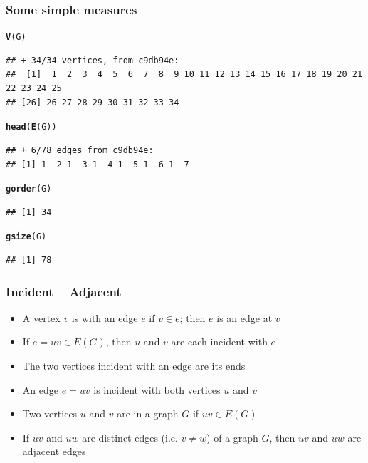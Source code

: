 \documentclass[aspectratio=169]{beamer}\usepackage[]{graphicx}\usepackage[]{xcolor}
\makeatletter
\newcommand{\hldef}[1]{\textcolor[rgb]{0.345,0.345,0.345}{#1}}%
\newcommand{\hlkwd}[1]{\textcolor[rgb]{0.737,0.353,0.396}{\textbf{#1}}}%
\newenvironment{kframe}{%
 \def\at@end@of@kframe{}%
 \ifinner\ifhmode%
  \def\at@end@of@kframe{\end{minipage}}%
  \begin{minipage}{\columnwidth}%
 \fi\fi%
 \def\FrameCommand##1{\hskip\@totalleftmargin \hskip-\fboxsep
 \colorbox{shadecolor}{##1}\hskip-\fboxsep
     \hskip-\linewidth \hskip-\@totalleftmargin \hskip\columnwidth}%
 \MakeFramed {\advance\hsize-\width
   \@totalleftmargin\z@ \linewidth\hsize
   \@setminipage}}%
 {\par\unskip\endMakeFramed%
 \at@end@of@kframe}
\newenvironment{knitrout}{}{} %
\makeatother
\begin{document}
\begin{frame}[fragile]\frametitle{Some simple measures}
\begin{knitrout}
\color{fgcolor}\begin{kframe}
\begin{alltt}
\hlkwd{V}\hldef{(G)}
\end{alltt}
\begin{verbatim}
## + 34/34 vertices, from c9db94e:
##  [1]  1  2  3  4  5  6  7  8  9 10 11 12 13 14 15 16 17 18 19 20 21 22 23 24 25
## [26] 26 27 28 29 30 31 32 33 34
\end{verbatim}
\begin{alltt}
\hlkwd{head}\hldef{(}\hlkwd{E}\hldef{(G))}
\end{alltt}
\begin{verbatim}
## + 6/78 edges from c9db94e:
## [1] 1--2 1--3 1--4 1--5 1--6 1--7
\end{verbatim}
\begin{alltt}
\hlkwd{gorder}\hldef{(G)}
\end{alltt}
\begin{verbatim}
## [1] 34
\end{verbatim}
\begin{alltt}
\hlkwd{gsize}\hldef{(G)}
\end{alltt}
\begin{verbatim}
## [1] 78
\end{verbatim}
\end{kframe}
\end{knitrout}
\end{frame}

\begin{frame}\frametitle{Incident -- Adjacent}
	\begin{definition}[Incident]
	\begin{itemize}
	\item A vertex $v$ is  with an edge $e$ if $v\in e$; then $e$ is an edge at $v$
	\item If $e=uv\in E(G)$, then $u$ and $v$ are each incident with $e$
	\item The two vertices incident with an edge are its ends
	\item An edge $e=uv$ is incident with both vertices $u$ and $v$
	\end{itemize}
	\end{definition}
	\vfill
	\begin{definition}[Adjacent]
	\begin{itemize}
	\item Two vertices $u$ and $v$ are  in a graph $G$ if $uv\in E(G)$
	\item If $uv$ and $uw$ are distinct edges (i.e. $v\not=w$) of a graph $G$, then $uv$ and $uw$ are adjacent edges
	\end{itemize}
	\end{definition}
\end{frame}
\end{document}
